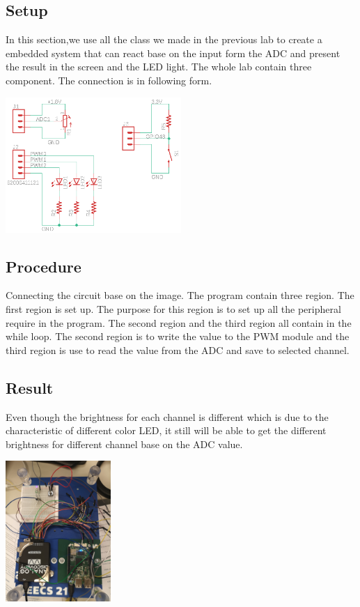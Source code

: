 \documentclass{article}
\begin{document}
\subsection{Setup}
In this section,we use all the class we made in the previous lab to create a embedded system that can react base on the input form the ADC and present the result in the screen and the LED light.
The whole lab contain three component. The connection is in following form.
\begin{center}
	\includegraphics[width=0.5\textwidth]{img/Lab1_5.PNG}
\end{center}
\subsection{Procedure}
Connecting the circuit base on the image. The program contain three region. The first region is set up. The purpose for this region is to set up all the peripheral require in the program. The second region and the third region all contain in the while loop. The second region is to write the value to the PWM module and the third region is use to read the value from the ADC and save to selected channel.
\subsection{Result}
Even though the brightness for each channel is different which is due to the characteristic of different color LED, it still will be able to get the different brightness for different channel base on the ADC value.
\begin{center}
	\includegraphics[width=0.3\textwidth]{img/Lab1_6.jpg}
\end{center}
\clearpage
\end{document}
